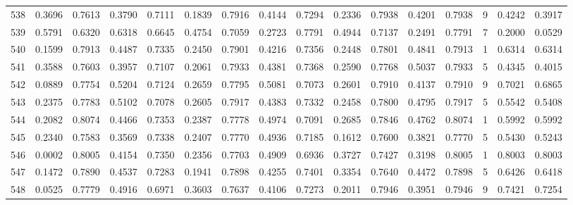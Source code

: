\begin{tabular}{lrrrrrrrrrrrrrrr}
538 &      0.3696 &  0.7613 &  0.3790 &  0.7111 &  0.1839 &  0.7916 &  0.4144 &  0.7294 &  0.2336 &  0.7938 &   0.4201 &     0.7938 &      9 &                    0.4242 &                     0.3917 \\
539 &      0.5791 &  0.6320 &  0.6318 &  0.6645 &  0.4754 &  0.7059 &  0.2723 &  0.7791 &  0.4944 &  0.7137 &   0.2491 &     0.7791 &      7 &                    0.2000 &                     0.0529 \\
540 &      0.1599 &  0.7913 &  0.4487 &  0.7335 &  0.2450 &  0.7901 &  0.4216 &  0.7356 &  0.2448 &  0.7801 &   0.4841 &     0.7913 &      1 &                    0.6314 &                     0.6314 \\
541 &      0.3588 &  0.7603 &  0.3957 &  0.7107 &  0.2061 &  0.7933 &  0.4381 &  0.7368 &  0.2590 &  0.7768 &   0.5037 &     0.7933 &      5 &                    0.4345 &                     0.4015 \\
542 &      0.0889 &  0.7754 &  0.5204 &  0.7124 &  0.2659 &  0.7795 &  0.5081 &  0.7073 &  0.2601 &  0.7910 &   0.4137 &     0.7910 &      9 &                    0.7021 &                     0.6865 \\
543 &      0.2375 &  0.7783 &  0.5102 &  0.7078 &  0.2605 &  0.7917 &  0.4383 &  0.7332 &  0.2458 &  0.7800 &   0.4795 &     0.7917 &      5 &                    0.5542 &                     0.5408 \\
544 &      0.2082 &  0.8074 &  0.4466 &  0.7353 &  0.2387 &  0.7778 &  0.4974 &  0.7091 &  0.2685 &  0.7846 &   0.4762 &     0.8074 &      1 &                    0.5992 &                     0.5992 \\
545 &      0.2340 &  0.7583 &  0.3569 &  0.7338 &  0.2407 &  0.7770 &  0.4936 &  0.7185 &  0.1612 &  0.7600 &   0.3821 &     0.7770 &      5 &                    0.5430 &                     0.5243 \\
546 &      0.0002 &  0.8005 &  0.4154 &  0.7350 &  0.2356 &  0.7703 &  0.4909 &  0.6936 &  0.3727 &  0.7427 &   0.3198 &     0.8005 &      1 &                    0.8003 &                     0.8003 \\
547 &      0.1472 &  0.7890 &  0.4537 &  0.7283 &  0.1941 &  0.7898 &  0.4255 &  0.7401 &  0.3354 &  0.7640 &   0.4472 &     0.7898 &      5 &                    0.6426 &                     0.6418 \\
548 &      0.0525 &  0.7779 &  0.4916 &  0.6971 &  0.3603 &  0.7637 &  0.4106 &  0.7273 &  0.2011 &  0.7946 &   0.3951 &     0.7946 &      9 &                    0.7421 &                     0.7254 \\

\end{tabular}
